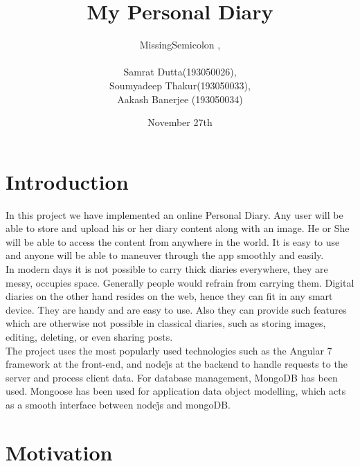 \documentclass[runningheads]{llncs}
\begin{document}
\title{My Personal Diary}
%
\author{MissingSemicolon
,\\\\Samrat Dutta(193050026),\\
Soumyadeep Thakur(193050033), \\
Aakash Banerjee (193050034)}
\date{November 27th}
%
%


%

\maketitle              %
%



%
%
\section{Introduction}

    In this project we have implemented an online Personal Diary. Any user will be able to store and upload his or her diary content along with an image. He or She will be able to access the content from anywhere in the world. It is easy to use and anyone will be able to maneuver through the app smoothly and easily. 
    \\
    In modern days it is not possible to carry thick diaries everywhere, they are messy, occupies space. Generally people would refrain from carrying them. Digital diaries on the other hand resides on the web, hence they can fit in any smart device. They are handy and are easy to use. Also they can provide such features which are otherwise not possible in classical diaries, such as storing images, editing, deleting, or even sharing posts. 
    \\
    The project uses the most popularly used technologies such as the Angular 7 framework at the front-end, and node\.js at the backend to handle requests to the server and process client data. For database management, MongoDB has been used. Mongoose has been used for application data object modelling, which acts as a smooth interface between node\.js and mongoDB.

\section{Motivation}
\end{document}
